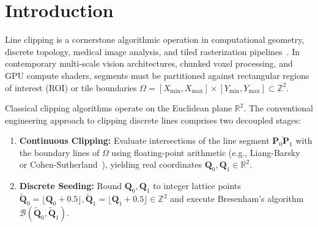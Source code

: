 \documentclass[runningheads]{llncs}
\begin{document}
\section{Introduction}
\label{sec:intro}

Line clipping is a cornerstone algorithmic operation in computational geometry, discrete topology, medical image analysis, and tiled rasterization pipelines~\cite{cohen1967clipping,liang1984new,nicholl1987efficient}. In contemporary multi-scale vision architectures, chunked voxel processing, and GPU compute shaders, segments must be partitioned against rectangular regions of interest (ROI) or tile boundaries $\Omega = [X_{\min}, X_{\max}] \times [Y_{\min}, Y_{\max}] \subset \mathbb{Z}^2$.

Classical clipping algorithms operate on the Euclidean plane $\mathbb{R}^2$. The conventional engineering approach to clipping discrete lines comprises two decoupled stages:
\begin{enumerate}
    \item \textbf{Continuous Clipping:} Evaluate intersections of the line segment $\overline{\mathbf{P}_0 \mathbf{P}_1}$ with the boundary lines of $\Omega$ using floating-point arithmetic (e.g., Liang-Barsky~\cite{liang1984new} or Cohen-Sutherland~\cite{cohen1967clipping}), yielding real coordinates $\mathbf{Q}_0, \mathbf{Q}_1 \in \mathbb{R}^2$.
    \item \textbf{Discrete Seeding:} Round $\mathbf{Q}_0, \mathbf{Q}_1$ to integer lattice points $\tilde{\mathbf{Q}}_0 = \lfloor \mathbf{Q}_0 + 0.5 \rfloor, \tilde{\mathbf{Q}}_1 = \lfloor \mathbf{Q}_1 + 0.5 \rfloor \in \mathbb{Z}^2$ and execute Bresenham's algorithm~\cite{bresenham1965algorithm} $\mathcal{B}(\tilde{\mathbf{Q}}_0, \tilde{\mathbf{Q}}_1)$.
\end{enumerate}
\end{document}
